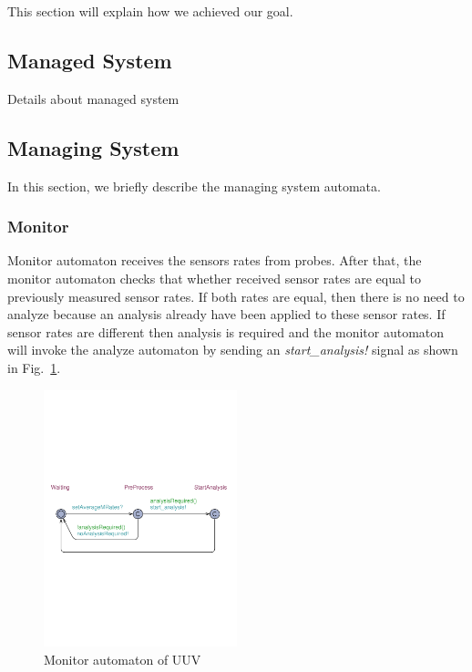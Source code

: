 This section will explain how we achieved our goal.

\subsection{Managed System}
Details about managed system

\subsection{Managing System}
In this section, we briefly describe the managing system automata. 

\subsubsection{Monitor}
Monitor automaton receives the sensors rates from probes. After that, the monitor automaton checks that whether received sensor rates are equal to previously measured sensor rates. If both rates are equal, then there is no need to analyze because an analysis already have been applied to these sensor rates. If sensor rates are different then analysis is required and the monitor automaton will invoke the analyze automaton by sending an \textit{start\_analysis!} signal as shown in Fig.~\ref{fig:monitor-automaton}. 

\begin{figure}[t]
	\centering
	\includegraphics[width=0.5\textwidth]{figures/Monitor}
	\caption{Monitor automaton of UUV}\label{fig:monitor-automaton}
	
	\vspace*{-2mm}
\end{figure}

